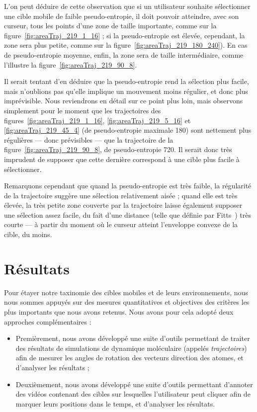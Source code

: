	L'on peut déduire de cette observation que si un utilisateur souhaite sélectionner une cible mobile de faible pseudo-entropie, il doit pouvoir atteindre, avec son curseur, tous les points d'une zone de taille importante, comme sur la figure~\ref{fig:areaTraj_219_1_16} ; si la pseudo-entropie est élevée, cependant, la zone sera plus petite, comme sur la figure~\ref{fig:areaTraj_219_180_240}). En cas de pseudo-entropie moyenne, enfin, la zone sera de taille intermédiaire, comme l'illustre la figure~\ref{fig:areaTraj_219_90_8}.
	
	Il serait tentant d'en déduire que la pseudo-entropie rend la sélection plus facile, mais n'oublions pas qu'elle implique un mouvement moins régulier, et donc plus imprévisible. Nous reviendrons en détail sur ce point plus loin, mais observons simplement pour le moment que les trajectoires des figures~\ref{fig:areaTraj_219_1_16}, \ref{fig:areaTraj_219_5_16} et \ref{fig:areaTraj_219_45_4} (de pseudo-entropie maximale 180) sont nettement plus régulières --- donc prévisibles --- que la trajectoire de la figure~\ref{fig:areaTraj_219_90_8}, de pseudo-entropie 720. Il serait donc très imprudent de supposer que cette dernière correspond à une cible plus facile à sélectionner.
	
	Remarquons cependant que quand la pseudo-entropie est très faible, la régularité de la trajectoire suggère une sélection relativement aisée ; quand elle est très élevée, la très petite zone couverte par la trajectoire laisse également supposer une sélection assez facile, du fait d'une distance (telle que définie par Fitts~\cite{fitts1954information}) très courte --- à partir du moment où le curseur atteint l'enveloppe convexe de la cible, du moins.
	
\section{Résultats}
	Pour étayer notre taxinomie des cibles mobiles et de leurs environnements, nous nous sommes appuyés sur des mesures quantitatives et objectives des critères les plus importants que nous avons retenus. Nous avons pour cela adopté deux approches complémentaires :
	
	\begin{itemize}
		\item Premièrement, nous avons développé une suite d'outils permettant de traiter des résultats de simulations de dynamique moléculaire (appelés \emph{trajectoires}) afin de mesurer les angles de rotation des vecteurs direction des atomes, et d'analyser les résultats ;
		\item Deuxièmement, nous avons développé une suite d'outils permettant d'annoter des vidéos contenant des cibles sur lesquelles l'utilisateur peut cliquer afin de marquer leurs positions dans le temps, et d'analyser les résultats.
	\end{itemize}

